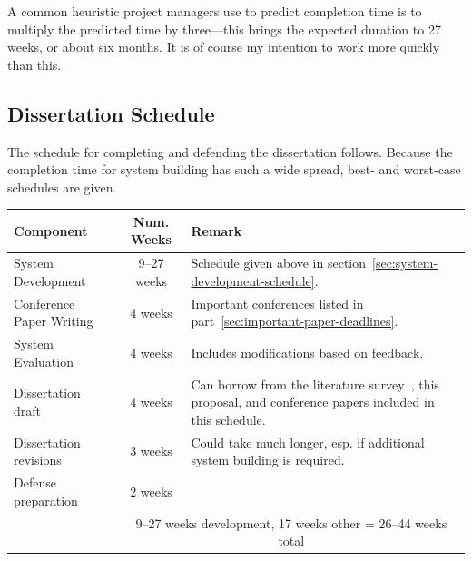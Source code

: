 \documentclass[12pt]{article}
\begin{document}
A common heuristic project managers use to predict completion time is
to multiply the predicted time by three---this brings the expected
duration to 27 weeks, or about six months. It is of course my
intention to work more quickly than this.


\subsection{Dissertation Schedule}

The schedule for completing and defending the dissertation
follows. Because the completion time for system building has such a
wide spread, best- and worst-case schedules are given.

\vspace{12pt}
\begin{tabular}{ | l | c | p{70mm} | }
  \hline

  \textbf{Component} & \textbf{Num. Weeks} & \textbf{Remark} \\

  \hline \hline

  System Development & 9--27 weeks & Schedule given above in
  section~\ref{sec:system-development-schedule}. \\

  Conference Paper Writing & 4 weeks & Important conferences listed in
  part~\ref{sec:important-paper-deadlines}. \\

  System Evaluation & 4 weeks & Includes modifications based on
  feedback. \\ 

  Dissertation draft & 4 weeks & Can borrow from the literature
  survey~\cite{johnson-sketch-review}, this proposal, and conference
  papers included in this schedule. \\

  Dissertation revisions & 3 weeks & Could take much longer, esp. if
  additional system building is required.\\

  Defense preparation & 2 weeks & \\

  \hline
  
  & \multicolumn{2}{|c|}{9--27 weeks development, 17 weeks other = 26--44 weeks total} \\

  \hline

\end{tabular}
\vspace{12pt}
\end{document}
